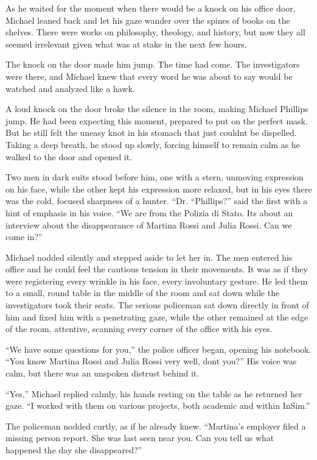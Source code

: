 \documentclass[
]{article}
\begin{document}
As he waited for the moment when there would be a knock on his office
door, Michael leaned back and let his gaze wander over the spines of
books on the shelves. There were works on philosophy, theology, and
history, but now they all seemed irrelevant given what was at stake in
the next few hours.

The knock on the door made him jump. The time had come. The
investigators were there, and Michael knew that every word he was about
to say would be watched and analyzed like a hawk.

A loud knock on the door broke the silence in the room, making Michael
Phillips jump. He had been expecting this moment, prepared to put on the
perfect mask. But he still felt the uneasy knot in his stomach that just
couldn\textquotesingle t be dispelled. Taking a deep breath, he stood up
slowly, forcing himself to remain calm as he walked to the door and
opened it.

Two men in dark suits stood before him, one with a stern, unmoving
expression on his face, while the other kept his expression more
relaxed, but in his eyes there was the cold, focused sharpness of a
hunter. ``Dr. ``Phillips?'' said the first with a hint of emphasis in
his voice. ``We are from the Polizia di Stato. It\textquotesingle s
about an interview about the disappearance of Martina Rossi and Julia
Rossi. Can we come in?''

Michael nodded silently and stepped aside to let her in. The men entered
his office and he could feel the cautious tension in their movements. It
was as if they were registering every wrinkle in his face, every
involuntary gesture. He led them to a small, round table in the middle
of the room and sat down while the investigators took their seats. The
serious policeman sat down directly in front of him and fixed him with a
penetrating gaze, while the other remained at the edge of the room,
attentive, scanning every corner of the office with his eyes.

``We have some questions for you,'' the police officer began, opening
his notebook. ``You know Martina Rossi and Julia Rossi very well,
don\textquotesingle t you?'' His voice was calm, but there was an
unspoken distrust behind it.

``Yes,'' Michael replied calmly, his hands resting on the table as he
returned her gaze. ``I worked with them on various projects, both
academic and within InSim.''

The policeman nodded curtly, as if he already knew. ``Martina's employer
filed a missing person report. She was last seen near you. Can you tell
us what happened the day she disappeared?''
\end{document}
